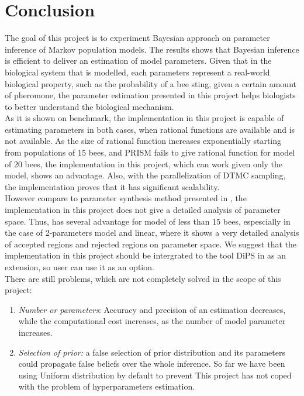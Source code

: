 \documentclass[12pt]{article}
\theoremstyle{definition}
\begin{document}
\section{Conclusion}
The goal of this project is to experiment Bayesian approach on parameter
inference of Markov population models. The results shows that Bayesian inference
is efficient to deliver an estimation of model parameters. Given that in the
biological system that is modelled, each parameters represent a real-world
biological property, such as the probability of a bee sting, given a certain
amount of pheromone, the parameter estimation presented in this project helps
biologists to better understand the biological mechanism.\\
As it is shown on benchmark, the implementation in this project is capable of
estimating parameters in both cases, when rational functions are available and is
not available. As the size of rational function increases exponentially starting
from populations of 15 bees, and PRISM fails to give rational function for model
of 20 bees, the implementation in this project, which can work given only the
model, shows an advantage. Also, with the parallelization of DTMC sampling, the
implementation proves that it has significant scalability.\\
However compare to parameter synthesis method presented in \cite{hajnal2019data}, the
implementation in this project does not give a detailed analysis of parameter
space. Thus, \cite{hajnal2019data} has several advantage for model of less than
15 bees, espescially in the case of 2-parameters model and linear, where it shows a very
detailed analysis of accepted regions and rejected regions on parameter space.
We suggest that the implementation in this project should be intergrated to the
tool DiPS in \cite{hajnal2019data} as an extension, so user can use it as an option.\\
There are still problems, which are not completely solved in the scope of this project:
\begin{enumerate}
\item \textit{Number or parameters}: Accuracy and precision of an estimation
  decreases, while the computational cost increases, as the number of model
  parameter increases.
\item \textit{Selection of prior:} a false selection of prior distribution and
  its parameters could propagate false beliefs over the whole inference. So far
  we have been using Uniform distribution by default to prevent 
  This project has not coped with the problem of hyperparameters
  estimation.
\end{enumerate}





\newpage
\printbibliography
\end{document}
